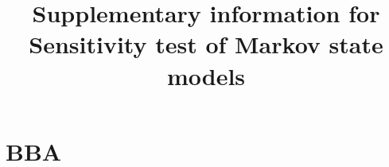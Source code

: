 \documentclass{article}
\title{Supplementary information for Sensitivity test of Markov state models}
\DeclareMathOperator*{\argmax}{arg\,max}
\begin{document}
\maketitle




\section{BBA}
\end{document}
